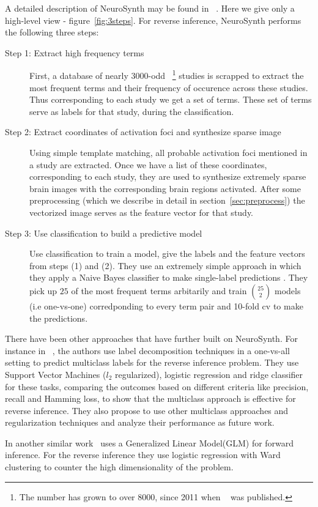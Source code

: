\documentclass{article} %
\begin{document}
A detailed description of NeuroSynth may be found in ~\cite{yarkoni2011large}. Here we give only a high-level view  - figure~\ref{fig:3steps}.  For reverse inference, NeuroSynth performs the following three steps:
\begin{description}
\item[Step 1:  Extract high frequency terms] First, a database of nearly $3000$-odd ~\footnote{The number has grown to over $8000$, since 2011 when ~\cite{yarkoni2011large} was published.} studies is scrapped to extract the most frequent terms and their frequency of occurence across these studies. Thus corresponding to each study we get a set of terms. These set of terms serve as labels for that study, during the classification.
\item[Step 2: Extract coordinates of activation foci and synthesize sparse image] Using simple template matching, all probable activation foci mentioned in a study are extracted. Once we have a list of these coordinates, corresponding to each study, they are used to synthesize extremely sparse brain images with the corresponding brain regions activated. After some preprocessing (which we describe in detail in section~\ref{sec:preprocess}) the vectorized image serves as the feature vector for that study.
\item[Step 3: Use classification to build a predictive model]  Use classification to train a model, give the labels and the feature vectors from steps (1) and (2). They use an extremely simple approach in which they apply a Naive Bayes classifier to make single-label predictions . They pick up $25$ of the most frequent terms arbitarily and train $25 \choose 2$ models (i.e one-vs-one) corredponding to every term pair and 10-fold cv to make the predictions.
\end{description}

There have been other approaches that have further built on NeuroSynth. For instance in ~\cite{sanmi2013multi}, the authors use label decomposition techniques in a one-vs-all setting to predict multiclass labels for the reverse inference problem. They use Support Vector Machines ($l_2$ regularized), logistic regression and ridge classifier for these tasks,  comparing the outcomes based on different criteria like precision, recall and Hamming loss, to show that the multiclass approach is effective for reverse inference. They also propose to use other multiclass approaches and regularization techniques and analyze their performance as future work. 

In another similar work~\cite{schwartz2013mapping} uses a Generalized Linear Model(GLM) for forward inference. For the reverse inference they use logistic regression with Ward clustering to counter the high dimensionality of the problem. 
\end{document}
